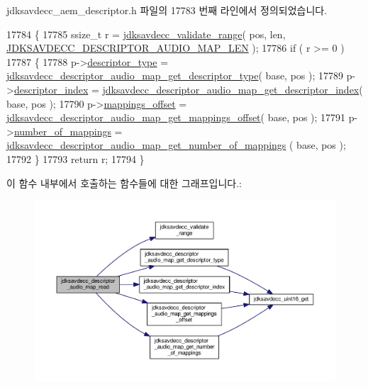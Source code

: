 jdksavdecc\+\_\+aem\+\_\+descriptor.\+h 파일의 17783 번째 라인에서 정의되었습니다.


\begin{DoxyCode}
17784 \{
17785     ssize\_t r = \hyperlink{group__util_ga9c02bdfe76c69163647c3196db7a73a1}{jdksavdecc\_validate\_range}( pos, len, 
      \hyperlink{group__descriptor__audio__map_gaf25e1ca640ec4fced1a131446d24dd9f}{JDKSAVDECC\_DESCRIPTOR\_AUDIO\_MAP\_LEN} );
17786     \textcolor{keywordflow}{if} ( r >= 0 )
17787     \{
17788         p->\hyperlink{structjdksavdecc__descriptor__audio__map_ab7c32b6c7131c13d4ea3b7ee2f09b78d}{descriptor\_type} = 
      \hyperlink{group__descriptor__audio__map_gab57df9d786be8ce514ac81a5fd218f05}{jdksavdecc\_descriptor\_audio\_map\_get\_descriptor\_type}( 
      base, pos );
17789         p->\hyperlink{structjdksavdecc__descriptor__audio__map_a042bbc76d835b82d27c1932431ee38d4}{descriptor\_index} = 
      \hyperlink{group__descriptor__audio__map_ga9077f7e1cdcabda7ff66624904e2464d}{jdksavdecc\_descriptor\_audio\_map\_get\_descriptor\_index}( 
      base, pos );
17790         p->\hyperlink{structjdksavdecc__descriptor__audio__map_ac91a41273e32c7bf86ca390838721642}{mappings\_offset} = 
      \hyperlink{group__descriptor__audio__map_ga369b9ebfaae3ca2590e06417bcdbbd9f}{jdksavdecc\_descriptor\_audio\_map\_get\_mappings\_offset}( 
      base, pos );
17791         p->\hyperlink{structjdksavdecc__descriptor__audio__map_ac7db472c5622ef473d5d0a5c416d5531}{number\_of\_mappings} = 
      \hyperlink{group__descriptor__audio__map_ga59b4ae6826866f6cefd533a4b813cbe0}{jdksavdecc\_descriptor\_audio\_map\_get\_number\_of\_mappings}
      ( base, pos );
17792     \}
17793     \textcolor{keywordflow}{return} r;
17794 \}
\end{DoxyCode}


이 함수 내부에서 호출하는 함수들에 대한 그래프입니다.\+:
\nopagebreak
\begin{figure}[H]
\begin{center}
\leavevmode
\includegraphics[width=350pt]{group__descriptor__audio__map_gae2eb0d9fdddb2c5269075fc5506e2413_cgraph}
\end{center}
\end{figure}


